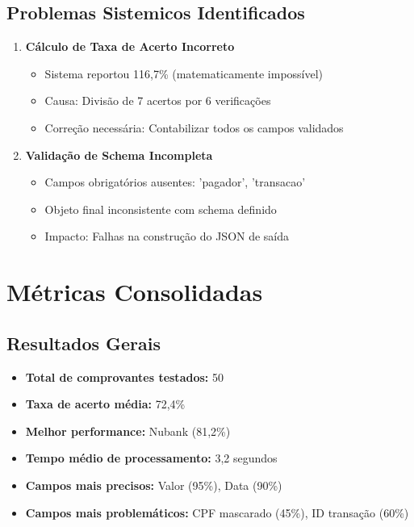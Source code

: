 \subsection{Problemas Sistemicos Identificados}

\begin{enumerate}
    \item \textbf{Cálculo de Taxa de Acerto Incorreto}
    \begin{itemize}
        \item Sistema reportou 116,7\% (matematicamente impossível)
        \item Causa: Divisão de 7 acertos por 6 verificações
        \item Correção necessária: Contabilizar todos os campos validados
    \end{itemize}
    
    \item \textbf{Validação de Schema Incompleta}
    \begin{itemize}
        \item Campos obrigatórios ausentes: 'pagador', 'transacao'
        \item Objeto final inconsistente com schema definido
        \item Impacto: Falhas na construção do JSON de saída
    \end{itemize}
\end{enumerate}

\section{Métricas Consolidadas}

\subsection{Resultados Gerais}

\begin{itemize}
    \item \textbf{Total de comprovantes testados:} 50
    \item \textbf{Taxa de acerto média:} 72,4\%
    \item \textbf{Melhor performance:} Nubank (81,2\%)
    \item \textbf{Tempo médio de processamento:} 3,2 segundos
    \item \textbf{Campos mais precisos:} Valor (95\%), Data (90\%)
    \item \textbf{Campos mais problemáticos:} CPF mascarado (45\%), ID transação (60\%)
\end{itemize}

